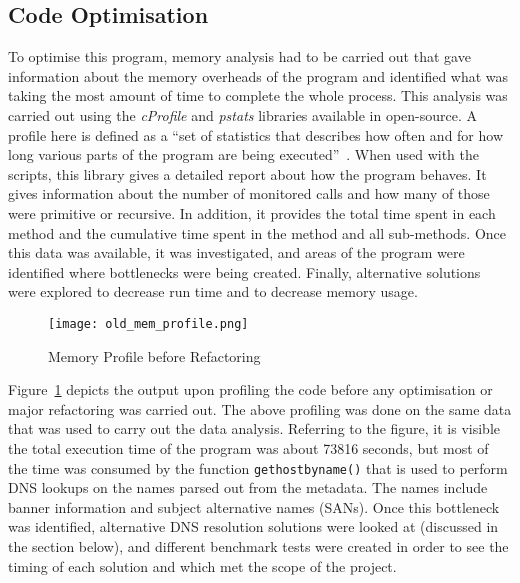 \subsection{Code Optimisation}
To optimise this program, memory analysis had to be carried out that gave information about the memory overheads of the program and identified what was 
taking the most amount of time to complete the whole process. This analysis was carried out using the \textit{cProfile} and \textit{pstats} 
libraries available in open-source. A profile here is defined as a ``set of statistics that describes how often and for how long various parts 
of the program are being executed''~\cite{ThePytho56:online}. When used with the scripts, this library gives a detailed report about how the program behaves. 
It gives information about the number of monitored calls and how many of those were primitive or recursive. In addition, it provides the total time spent 
in each method and the cumulative time spent in the method and all sub-methods. Once this data was available, it was investigated, and areas of the program were 
identified where bottlenecks were being created. Finally, alternative solutions were explored to decrease run time and to decrease memory usage.
\newpage

\begin{figure}[h!]
    \centering
    \texttt{[image: old\_mem\_profile.png]}
    \caption{Memory Profile before Refactoring}
    \label{fig:oldmemprof}
\end{figure}

\noindent Figure~\ref*{fig:oldmemprof} depicts the output upon profiling the code before any optimisation or major refactoring was carried out. 
The above profiling was done on the same data that was used to carry out the data analysis. Referring to the figure, it is visible the total 
execution time of the program was about 73816 seconds, but most of the time was consumed by the function \verb|gethostbyname()| that is 
used to perform DNS lookups on the names parsed out from the metadata. The names include banner information and 
subject alternative names (SANs). Once this bottleneck was identified, alternative DNS resolution solutions were looked at 
(discussed in the section below), and different benchmark tests were created in order to see the timing of each solution and which met the 
scope of the project.


